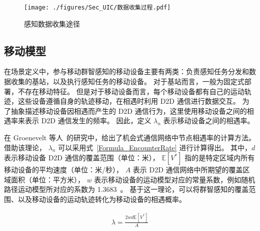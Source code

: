 \begin{figure}[!h]
  \centering
  \texttt{[image: ./figures/Sec\_UIC/数据收集过程.pdf]}
  \vspace{-0.5em}
  \caption{感知数据收集途径}
  \vspace{-1.5em}
  \label{Figure_FeedbacksCollection}
\end{figure}

\subsection{移动模型}

在场景定义中，参与移动群智感知的移动设备主要有两类：负责感知任务分发和数据收集的基站，以及执行感知任务的移动设备。
对于基站而言，一般为固定式部署，不存在移动特征。
但是对于移动设备而言，每个移动设备都有自己的运动轨迹，这些设备遵循自身的轨迹移动，在相遇时利用 D2D 通信进行数据交互。
为了抽象描述移动设备因相遇而产生的 D2D 通信行为，这里使用移动设备之间的相遇率来表示 D2D 通信发生的频率。
因此，定义 $\lambda_n$ 表示移动设备之间的相遇率。

在 Groenevelt 等人~\cite{DBLP:journals/pe/GroeneveltNK05}的研究中，给出了机会式通信网络中节点相遇率的计算方法。
借助该理论， $\lambda_n$ 可以采用式~\eqref{Formula_EncounterRate} 进行计算得出。
其中，$d$ 表示移动设备 D2D 通信的覆盖范围（单位：米），
$\mathbb{E}[V^*]$ 指的是特定区域内所有移动设备的平均速度（单位：米/秒），
$A$ 表示 D2D 通信网络中所期望的覆盖区域面积（单位：平方米），
$w$ 表示移动设备的运动模型对应的常量系数，例如随机路径运动模型所对应的系数为 1.3683~\cite{DBLP:journals/pe/GroeneveltNK05}。
基于这一理论，可以将群智感知的覆盖范围、以及移动设备的运动轨迹转化为移动设备的相遇概率。

\vspace{-1em}
\begin{equation}
  \label{Formula_EncounterRate}
  \begin{gathered}
  \lambda = \frac{2 w d \mathbb{E}[V^*]}{A}
  \end{gathered}
\end{equation}

